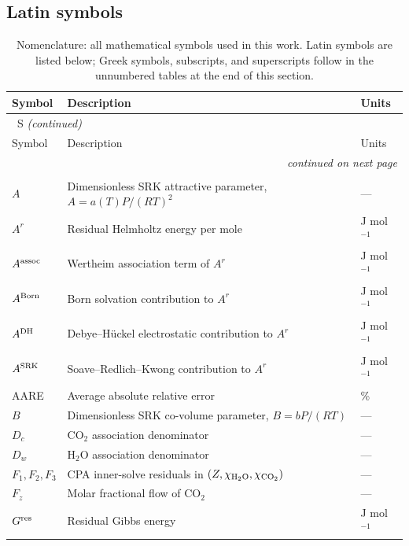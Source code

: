\documentclass[preprint,12pt,number]{elsarticle}
\renewcommand{\thetable}{S\arabic{table}}
\begin{document}
\subsection*{Latin symbols}

\begin{longtable}{@{}p{}p{}p{}@{}}
  \caption{Nomenclature: all mathematical symbols used in this work.
           Latin symbols are listed below; Greek symbols, subscripts, and
           superscripts follow in the unnumbered tables at the end of this section.}
  \label{tab:nomenclature}\\
  \toprule
  Symbol & Description & Units \\
  \midrule
  \endfirsthead
  \multicolumn{3}{l}{\small\tablename~\thetable{} \textit{(continued)}}\\[2pt]
  \toprule
  Symbol & Description & Units \\
  \midrule
  \endhead
  \midrule
  \multicolumn{3}{r}{\textit{continued on next page}} \\
  \endfoot
  \bottomrule
  \endlastfoot
  \multicolumn{3}{l}{\textit{Upper case}} \\[2pt]
  $A$ & Dimensionless SRK attractive parameter, $A = a(T)P/(RT)^2$ & --- \\
  $A^r$ & Residual Helmholtz energy per mole & J mol$^{-1}$ \\
  $A^{\rm assoc}$ & Wertheim association term of $A^r$ & J mol$^{-1}$ \\
  $A^{\rm Born}$ & Born solvation contribution to $A^r$ & J mol$^{-1}$ \\
  $A^{\rm DH}$ & Debye--Hückel electrostatic contribution to $A^r$ & J mol$^{-1}$ \\
  $A^{\rm SRK}$ & Soave--Redlich--Kwong contribution to $A^r$ & J mol$^{-1}$ \\
  AARE & Average absolute relative error & \% \\
  $B$ & Dimensionless SRK co-volume parameter, $B = bP/(RT)$ & --- \\
  $D_c$ & CO$_2$ association denominator & --- \\
  $D_w$ & H$_2$O association denominator & --- \\
  $F_1, F_2, F_3$ & CPA inner-solve residuals in $(Z,\chi_{\rm H_2O},\chi_{\rm CO_2})$ & --- \\
  $F_z$ & Molar fractional flow of CO$_2$ & --- \\
  $G^{\rm res}$ & Residual Gibbs energy & J mol$^{-1}$ \\

\end{longtable}
\end{document}
